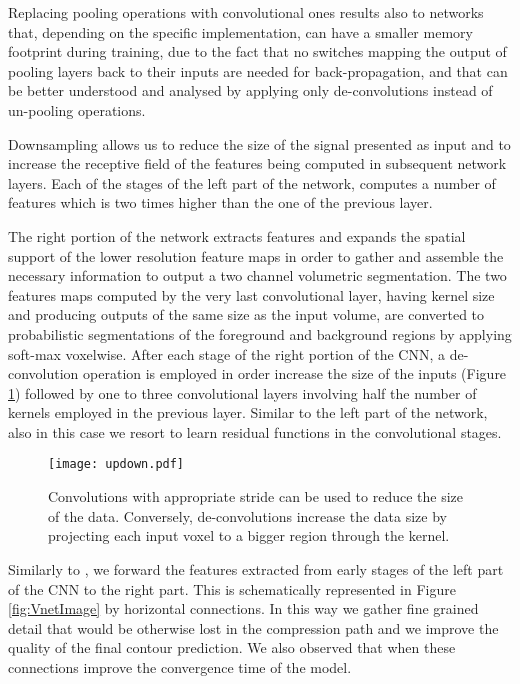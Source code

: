 \documentclass{llncs}
\begin{document}
Replacing pooling operations with convolutional ones results also to networks that, depending on the specific implementation, can have a smaller memory footprint during training, due to the fact that no switches mapping the output of pooling layers back to their inputs are needed for back-propagation, and that can be better understood and analysed \cite{zeiler2014visualizing} by applying only de-convolutions instead of un-pooling operations. 

Downsampling allows us to reduce the size of the signal presented as input and to increase the receptive field of the features being computed in subsequent network layers. Each of the stages of the left part of the network, computes a number of features which is two times higher than the one of the previous layer.

The right portion of the network extracts features and expands the spatial support of the lower resolution feature maps in order to gather and assemble the necessary information to output a two channel volumetric segmentation. The two features maps computed by the very last convolutional layer, having  kernel size and producing outputs of the same size as the input volume, are converted to probabilistic segmentations of the foreground and background regions by applying soft-max voxelwise.
After each stage of the right portion of the CNN, a de-convolution operation is employed in order increase the size of the inputs (Figure \ref{fig:updown}) followed by one to three convolutional layers involving half the number of  kernels employed in the previous layer. Similar to the left part of the network, also in this case we resort to learn residual functions in the convolutional stages.

\begin{figure} 	
\centering 	
\texttt{[image: updown.pdf]} 	
\caption{Convolutions with appropriate stride can be used to reduce the size of the data. Conversely, de-convolutions increase the data size by projecting each input voxel to a bigger region through the kernel.} \label{fig:updown} 
\end{figure}

Similarly to \cite{ronneberger2015u}, we forward the features extracted from early stages of the left part of the CNN to the right part. This is schematically represented in Figure \ref{fig:VnetImage} by horizontal connections. In this way we gather fine grained detail that would be otherwise lost in the compression path and we improve the quality of the final contour prediction. We also observed that when these connections improve the convergence time of the model.
\end{document}
